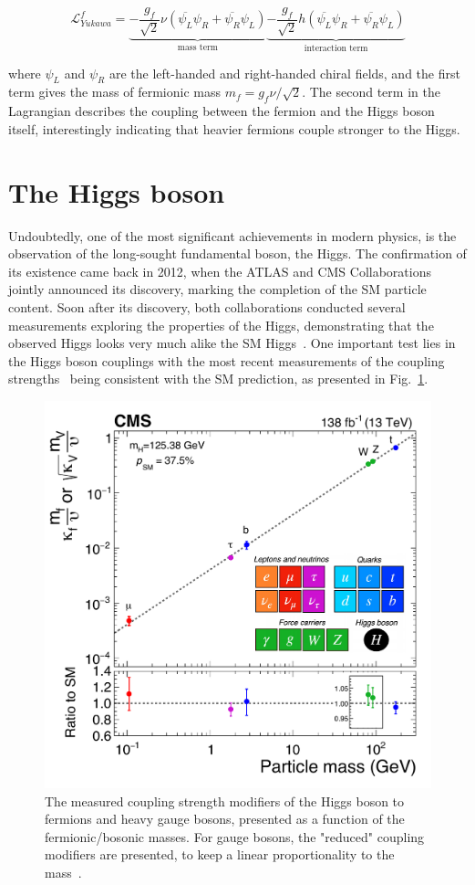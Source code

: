 \begin{equation}
    \mathcal{L}_{Yukawa}^f = \underbrace{-\frac{g_f}{\sqrt{2}}\nu(\overline{\psi_L}\psi_R + \overline{\psi_R} \psi_L)}_{\text{mass term}} \underbrace{- \frac{g_f}{\sqrt{2}}h(\overline{\psi_L}\psi_R + \overline{\psi_R} \psi_L)}_{\text{interaction term}}
\end{equation}

where $\psi_L$ and $\psi_R$ are the left-handed and right-handed chiral fields, and the first term gives the mass of fermionic mass $m_f = g_f\nu / \sqrt{2}$. The second term in the Lagrangian describes the coupling between the fermion and the Higgs boson itself, interestingly indicating that heavier fermions couple stronger to the Higgs.

\section{The Higgs boson}

Undoubtedly, one of the most significant achievements in modern physics, is the observation of the long-sought fundamental boson, the Higgs. The confirmation of its existence came back in 2012, when the ATLAS and CMS Collaborations~\cite{Higgs_ATLAS,Higgs_CMS} jointly announced its discovery, marking the completion of the SM particle content. Soon after its discovery, both collaborations conducted several measurements exploring the properties of the Higgs, demonstrating that the observed Higgs looks very much alike the SM Higgs~\cite{HiggsParity_1,HiggsParity_2}. One important test lies in the Higgs boson couplings with the most recent measurements of the coupling strengths~\cite{CMS_Couplings_Measurement} being consistent with the SM prediction, as presented in Fig.~\ref{Figure:Introduction_CMScouplings}.

\begin{figure}[h]
\centering
\includegraphics[width= .7\textwidth]{Figures/Introduction/CMS_Higgs_FermionCouplings.pdf}
\caption{The measured coupling strength modifiers of the Higgs boson to fermions and heavy gauge bosons, presented as a function of the fermionic/bosonic masses. For gauge bosons, the "reduced" coupling modifiers are presented, to keep a linear proportionality to the mass~\cite{CMS_Couplings_Measurement}.}
\label{Figure:Introduction_CMScouplings}
\end{figure}

